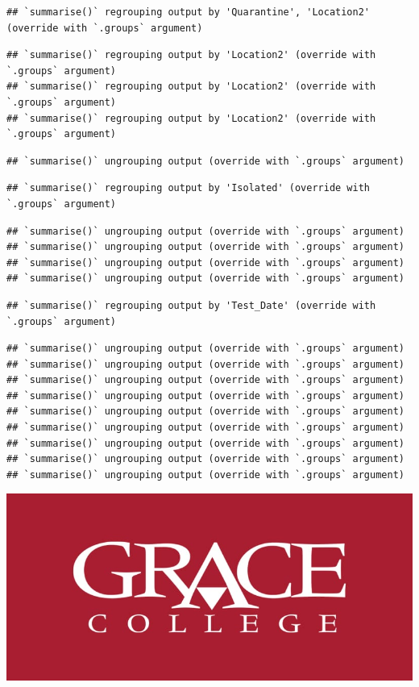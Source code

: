 \documentclass[
]{article}
\begin{document}
\begin{verbatim}
## `summarise()` regrouping output by 'Quarantine', 'Location2' (override with `.groups` argument)
\end{verbatim}

\begin{verbatim}
## `summarise()` regrouping output by 'Location2' (override with `.groups` argument)
## `summarise()` regrouping output by 'Location2' (override with `.groups` argument)
## `summarise()` regrouping output by 'Location2' (override with `.groups` argument)
\end{verbatim}

\begin{verbatim}
## `summarise()` ungrouping output (override with `.groups` argument)
\end{verbatim}

\begin{verbatim}
## `summarise()` regrouping output by 'Isolated' (override with `.groups` argument)
\end{verbatim}

\begin{verbatim}
## `summarise()` ungrouping output (override with `.groups` argument)
## `summarise()` ungrouping output (override with `.groups` argument)
## `summarise()` ungrouping output (override with `.groups` argument)
## `summarise()` ungrouping output (override with `.groups` argument)
\end{verbatim}

\begin{verbatim}
## `summarise()` regrouping output by 'Test_Date' (override with `.groups` argument)
\end{verbatim}

\begin{verbatim}
## `summarise()` ungrouping output (override with `.groups` argument)
## `summarise()` ungrouping output (override with `.groups` argument)
## `summarise()` ungrouping output (override with `.groups` argument)
## `summarise()` ungrouping output (override with `.groups` argument)
## `summarise()` ungrouping output (override with `.groups` argument)
## `summarise()` ungrouping output (override with `.groups` argument)
## `summarise()` ungrouping output (override with `.groups` argument)
## `summarise()` ungrouping output (override with `.groups` argument)
## `summarise()` ungrouping output (override with `.groups` argument)
\end{verbatim}

\includegraphics{Logo-GC-Red-Background-Stretched.jpg}\\
\end{document}
